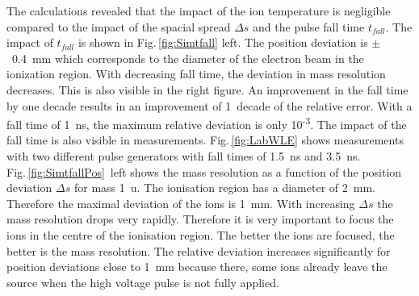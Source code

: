 	The calculations revealed that the impact of the ion temperature is negligible compared to the impact of the spacial spread $\Delta s$ and the pulse fall time $t_{fall}$. The impact of $t_{fall}$ is shown in Fig.\,\ref{fig:Simtfall} left. The position deviation is $\pm$~0.4~mm which corresponds to the diameter of the electron beam in the ionization region. With decreasing fall time, the deviation in mass resolution decreases. This is also visible in the right figure. An improvement in the fall time by one decade results in an improvement of 1~decade of the relative error. With a fall time of 1~ns, the maximum relative deviation is only 10\textsuperscript{-3}. The impact of the fall time is also visible in measurements. Fig.\,\ref{fig:LabWLE} shows measurements with two different pulse generators with fall times of 1.5~ns and 3.5~ns.\\
	Fig.\,\ref{fig:SimtfallPos}~left shows the mass resolution as a function of the position deviation $\Delta s$ for mass 1~u. The ionisation region has a diameter of 2~mm. Therefore the maximal deviation of the ions is 1~mm. With increasing $\Delta s$ the mass resolution drops very rapidly. Therefore it is very important to focus the ions in the centre of the ionisation region. The better the ions are focused, the better is the mass resolution. The relative deviation increases significantly for position deviations close to 1~mm because there, some ions already leave the source when the high voltage pulse is not fully applied.\\



